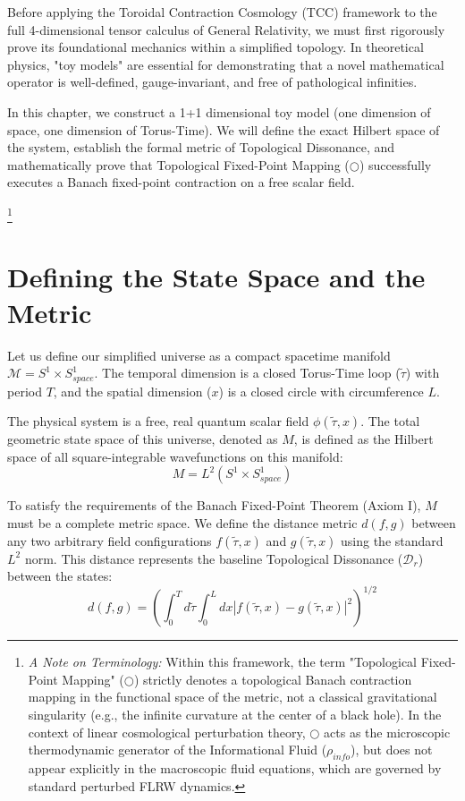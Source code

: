 \documentclass[12pt,openany]{book}
\theoremstyle{plain}
\theoremstyle{definition}
\theoremstyle{remark}
\begin{document}
Before applying the Toroidal Contraction Cosmology (TCC) framework to the full 4-dimensional tensor calculus of General Relativity, we must first rigorously prove its foundational mechanics within a simplified topology. In theoretical physics, "toy models" are essential for demonstrating that a novel mathematical operator is well-defined, gauge-invariant, and free of pathological infinities.

In this chapter, we construct a 1+1 dimensional toy model (one dimension of space, one dimension of Torus-Time). We will define the exact Hilbert space of the system, establish the formal metric of Topological Dissonance, and mathematically prove that Topological Fixed-Point Mapping ($\bigcirc$) successfully executes a Banach fixed-point contraction on a free scalar field.

\footnote{\textit{A Note on Terminology:} Within this framework, the term "Topological Fixed-Point Mapping" ($\bigcirc$) strictly denotes a topological Banach contraction mapping in the functional space of the metric, not a classical gravitational singularity (e.g., the infinite curvature at the center of a black hole). In the context of linear cosmological perturbation theory, $\bigcirc$ acts as the microscopic thermodynamic generator of the Informational Fluid ($\rho_{info}$), but does not appear explicitly in the macroscopic fluid equations, which are governed by standard perturbed FLRW dynamics.}

\section{Defining the State Space and the Metric}

Let us define our simplified universe as a compact spacetime manifold $\mathcal{M} = S^1 \times S^1_{space}$. The temporal dimension is a closed Torus-Time loop ($\tilde{\tau}$) with period $T$, and the spatial dimension ($x$) is a closed circle with circumference $L$. 

The physical system is a free, real quantum scalar field $\phi(\tilde{\tau}, x)$. The total geometric state space of this universe, denoted as $M$, is defined as the Hilbert space of all square-integrable wavefunctions on this manifold:
\begin{equation}
M = L^2(S^1 \times S^1_{space})
\end{equation}

To satisfy the requirements of the Banach Fixed-Point Theorem (Axiom I), $M$ must be a complete metric space. We define the distance metric $d(f, g)$ between any two arbitrary field configurations $f(\tilde{\tau}, x)$ and $g(\tilde{\tau}, x)$ using the standard $L^2$ norm. This distance represents the baseline Topological Dissonance ($\mathcal{D}_r$) between the states:
\begin{equation}
d(f, g) = \left( \int_0^T d\tilde{\tau} \int_0^L dx |f(\tilde{\tau}, x) - g(\tilde{\tau}, x)|^2 \right)^{1/2}
\end{equation}
\end{document}
